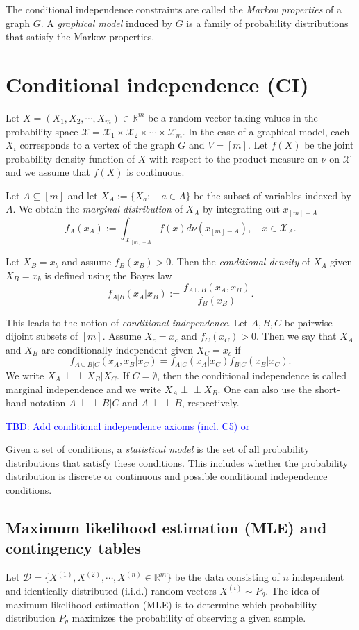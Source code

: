 \documentclass[10pt,a4paper]{article}
\newcommand{\indep}{\perp \!\!\! \perp}
\begin{document}
The conditional independence constraints are called the \emph{Markov properties} of a graph $G$. A \emph{graphical model} induced by $G$ is a family of probability distributions that satisfy the Markov properties.

\section{Conditional independence (CI)}\label{sec: CI}
Let $X=(X_1,X_2,\cdots,X_m)\in \mathbb{R}^m$ be a random vector taking values in the probability space $\mathcal{X}=\mathcal{X}_1\times\mathcal{X}_2\times\cdots\times\mathcal{X}_m$. In the case of a graphical model, each $X_i$ corresponds to a vertex of the graph $G$ and $V=[m]$. Let $f(X)$ be the joint probability density function of $X$ with respect to the product measure on $\nu$ on $\mathcal{X}$ and we assume that $f(X)$ is continuous.  

Let $A \subseteq [m]$ and let $X_A:=\{X_a:\quad a \in A\}$ be the subset of variables indexed by $A$. We obtain the \emph{marginal distribution} of $X_A$ by integrating out $x_{[m]-A}$
\[f_A(x_A):=\int_{\mathcal{X}_{[m]-A}} f(x)d\nu(x_{[m]-A}),\quad x \in \mathcal{X}_A.\]

Let $X_B=x_b$ and assume $f_B(x_B)>0$. Then the \emph{conditional density} of $X_A$ given $X_B=x_b$ is defined using the Bayes law
\[f_{A|B}(x_A|x_B):=\frac{f_{A\cup B}(x_A,x_B)}{f_B(x_B)}.\]

This leads to the notion of \emph{conditional independence}. Let $A,B,C$ be pairwise dijoint subsets of $[m]$. Assume $X_c=x_c$ and $f_C(x_C)>0$. Then we say that $X_A$ and $X_B$ are conditionally independent given $X_C=x_c$ if
\[f_{A\cup B|C}(x_A,x_B|x_C)=f_{A|C}(x_A|x_C)f_{B|C}(x_B|x_C).\]
We write $X_A\indep X_B|X_C$. If $C=\emptyset$, then the conditional independence is called marginal independence and we write $X_A\indep X_B$. One can also use the short-hand notation $A \indep B |C$ and $A \indep B$, respectively.

\textcolor{blue}{TBD: Add conditional independence axioms (incl. C5) \cite[p. 29]{lauritzen1996graphical} or \cite[Proposition 3.1.2 and Proposition 3.1.3]{drton2008lectures}}

Given a set of conditions, a \emph{statistical model} is the set of all probability distributions that satisfy these conditions. This includes whether the probability distribution is discrete or continuous and possible conditional independence conditions.

\subsection{Maximum likelihood estimation (MLE) and contingency tables}
Let $\mathcal{D}=\{X^{(1)},X^{(2)},\cdots,X^{(n)} \in \mathbb{R}^m\}$ be the data consisting of $n$ independent and identically distributed (i.i.d.) random vectors $X^{(i)}\sim P_\theta$. The idea of maximum likelihood estimation (MLE) is to determine which probability distribution $P_\theta$ maximizes the probability of observing a given sample. 
\end{document}
